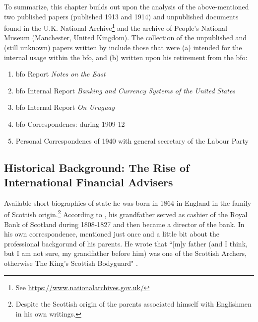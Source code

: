 To summarize, this chapter builds out upon the analysis of the above-mentioned two published papers (published 1913 and 1914) and unpublished documents found in the U.K. National Archive\footnote{See \url{https://www.nationalarchives.gov.uk/}} and the archive of People's National Museum (Manchester, United Kingdom). The collection of the unpublished and (still unknown) papers written by \citeauthor{innes1913} include those that were (a) intended for the internal usage within the \ac{bfo}, and (b) written upon his retirement from the \ac{bfo}:

\begin{enumerate}%
\item \ac{bfo} Report \textit{Notes on the East} \citep{innes1909}
\item \ac{bfo} Internal Report \textit{Banking and Currency Systems of the United States} \citep{innes1910}
\item \ac{bfo} Internal Report \textit{On Uruguay} \citep{innes1914a}
\item \ac{bfo} Correspondencs: during 1909-12 \citep{innes1909_,innes1911}
\item Personal Correspondencs of 1940 with general secretary of the Labour Party \citep{innes1940}
\end{enumerate}

\subsection{Historical Background: The Rise of International Financial Advisers}\label{sec:money_docs}

Available short biographies of \citeauthor{innes1913} state he was born in 1864 in England in the family of Scottish origin.\footnote{Despite the Scottish origin of the parents \citeauthor{innes1913} associated himself with Englishmen in his own writings.} According to \cite[p.~4]{wray2004}, his grandfather served as cashier of the Royal Bank of Scotland during 1808-1827 and then became a director of the bank. In his own correspondence, \citeauthor{innes1913} mentioned just once and a little bit about the professional backgorund of his parents. He wrote that ``[m]y father (and I think, but I am not sure, my grandfather before him) was one of the Scottish Archers, otherwise The King's Scottish Bodyguard" \citep{innes1911}.  

